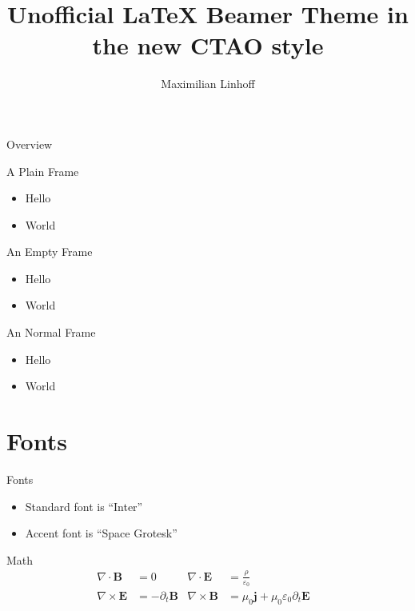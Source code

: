 \documentclass[aspectratio=1610, 9pt]{beamer}
\title{Unofficial LaTeX Beamer Theme in the new CTAO style}
\author[M.~Linhoff]{Maximilian Linhoff}
\institute[TU Dortmund]{TU Dortmund}
\begin{document}
\maketitle

\begin{frame}{Overview}
  \tableofcontents
\end{frame}

\begin{frame}[plain]{A Plain Frame}
  \begin{itemize}
    \item Hello
    \item World
  \end{itemize}
\end{frame}

\begin{frame}[plain]{An Empty Frame}
  \begin{itemize}
    \item Hello
    \item World
  \end{itemize}
\end{frame}

\begin{frame}[plain]{An Normal Frame}
  \begin{itemize}
    \item Hello
    \item World
  \end{itemize}
\end{frame}

\section{Fonts}
\begin{frame}{Fonts}
  \begin{itemize}
    \item Standard font is \enquote{Inter}
    \item {\accentfont Accent font is \enquote{Space Grotesk}} 
  \end{itemize}
\end{frame}

\begin{frame}{Math}
  \begin{align*}
    \nabla \cdot \symbf{B} &= 0 &
    \nabla \cdot \symbf{E} &= \frac{ρ}{ε_0} \\
    \nabla \times \symbf{E} &= -\partial_t \symbf{B} &
    \nabla \times \symbf{B} &= μ_0 \symbf{j} + μ_0 ε_0 \partial_t \symbf{E} &
  \end{align*}
\end{frame}
\end{document}
